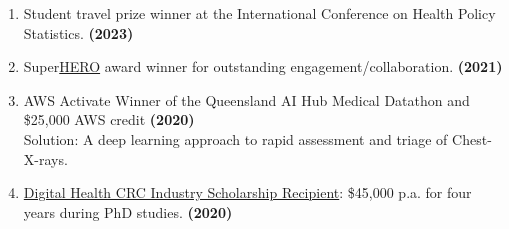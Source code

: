 \begin{enumerate}
	\item Student travel prize winner at the International Conference on Health Policy Statistics. \hfill\textbf{(2023)}
	\item Super\href{https://healthequity.link/}{HERO} award winner for outstanding engagement/collaboration. \hfill\textbf{(2021)}
    \item AWS Activate Winner of the Queensland AI Hub Medical Datathon and \$25,000 AWS credit \hfill\textbf{(2020)}\\
	Solution: A deep learning approach to rapid assessment and triage of Chest-X-rays.
	\item \href{https://www.credly.com/badges/ad81135e-f5a0-4f0f-beee-06144ec4d66e/public_url}{Digital Health CRC Industry Scholarship Recipient}: \$45,000 p.a. for four years during PhD studies. \hfill\textbf{(2020)}
\end{enumerate}\par